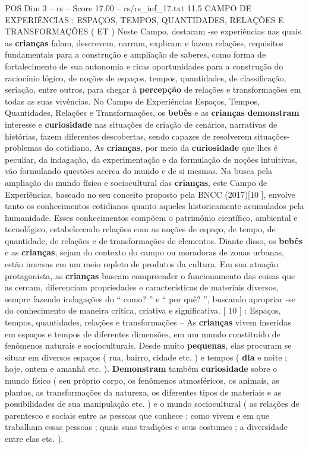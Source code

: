 \begin{textsample}{POS Dim 3 – rs – Score 17.00 – rs/rs\_inf\_17.txt}  \label{ex:f3_pos_247}
11.5 CAMPO DE EXPERIÊNCIAS : ESPAÇOS, TEMPOS, QUANTIDADES, RELAÇÕES E TRANSFORMAÇÕES ( ET ) Neste Campo, destacam -se experiências nas quais as \textbf{crianças} falam, descrevem, narram, explicam e fazem relações, requisitos fundamentais para a construção e ampliação de saberes, como forma de fortalecimento de sua autonomia e ricas oportunidades para a construção do raciocínio lógico, de noções de espaços, tempos, quantidades, de classificação, seriação, entre outros, para chegar à \textbf{percepção} de relações e transformações em todas as suas vivências.
No Campo de Experiências Espaços, Tempos, Quantidades, Relações e Transformações, os \textbf{bebês} e as \textbf{crianças} \textbf{demonstram} interesse e \textbf{curiosidade} nas situações de criação de cenários, narrativas de histórias, fazem diferentes descobertas, sendo capazes de resolverem situações-problemas do cotidiano.
As \textbf{crianças}, por meio da \textbf{curiosidade} que lhes é peculiar, da indagação, da experimentação e da formulação de noções intuitivas, vão formulando questões acerca do mundo e de si mesmas.
Na busca pela ampliação do mundo físico e sociocultural das \textbf{crianças}, este Campo de Experiências, baseado no seu conceito proposto pela BNCC (2017)[10 ], envolve tanto os conhecimentos cotidianos quanto aqueles historicamente acumulados pela humanidade.
Esses conhecimentos compõem o patrimônio científico, ambiental e tecnológico, estabelecendo relações com as noções de espaço, de tempo, de quantidade, de relações e de transformações de elementos.
Diante disso, os \textbf{bebês} e as \textbf{crianças}, sejam do contexto do campo ou moradoras de zonas urbanas, estão imersas em um meio repleto de produtos da cultura.
Em sua atuação protagonista, as \textbf{crianças} buscam compreender o funcionamento das coisas que as cercam, diferenciam propriedades e características de materiais diversos, sempre fazendo indagações do “ como? ” e “ por quê? ”, buscando apropriar -se do conhecimento de maneira crítica, criativa e significativa. [ 10 ] : Espaços, tempos, quantidades, relações e transformações – As \textbf{crianças} vivem inseridas em espaços e tempos de diferentes dimensões, em um mundo constituído de fenômenos naturais e socioculturais.
Desde muito \textbf{pequenas}, elas procuram se situar em diversos espaços ( rua, bairro, cidade etc. ) e tempos ( \textbf{dia} e noite ; hoje, ontem e amanhã etc. ). \textbf{Demonstram} também \textbf{curiosidade} sobre o mundo físico ( seu próprio corpo, os fenômenos atmosféricos, os animais, as plantas, as transformações da natureza, os diferentes tipos de materiais e as possibilidades de sua manipulação etc. ) e o mundo sociocultural ( as relações de parentesco e sociais entre as pessoas que conhece ; como vivem e em que trabalham essas pessoas ; quais suas tradições e seus costumes ; a diversidade entre elas etc. ).

\end{textsample}
